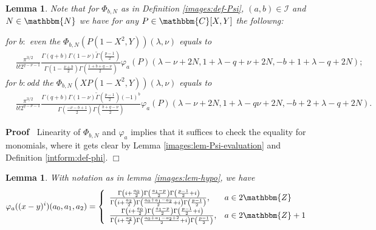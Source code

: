 \documentclass{article}
\renewenvironment{proof}{\noindent\textbf{Proof\ }}{\hspace*{\fill}$\Box$\medskip}
\newtheorem{lemma}[proposition]{Lemma}
\theoremstyle{remark}
\begin{document}
\begin{lemma}
  \label{images:rem-lem-hypo}Note that for $\Phi_{b, N}$ as in Definition
  \ref{images:def-Psi}, $(a, b) \in \mathcal{I}$ and $N \in \mathbbm{N}$ we
  have for any $P \in \mathbbm{C} [X, Y]$ the followng:
  
  for $b :$ even the $\Phi_{b, N} (P (1 - X^2, Y)) (\lambda, \nu)$ equals to
  \begin{eqnarray}
    & \frac{\pi^{3 / 2}}{b! 2^{q - \nu - 1}} \frac{\Gamma (q + b) \Gamma (1 -
    \nu) \tilde{\Gamma} \left( \frac{p - 1}{2} \right)}{\Gamma \left( 1 -
    \frac{\nu + b}{2} \right) \Gamma \left( \frac{1 + b + q - \nu}{2} \right)}
    \varphi_a (P) (\lambda - \nu + 2 N, 1 + \lambda - q + \nu + 2 N, - b + 1 +
    \lambda - q + 2 N) ; &  \nonumber
  \end{eqnarray}
  for $b :$odd the $\Phi_{b, N} (X P (1 - X^2, Y)) (\lambda, \nu)$ equals to
  \begin{eqnarray}
    & \frac{\pi^{3 / 2}}{b! 2^{q - \nu - 1}} \frac{\Gamma (q + b) \Gamma (1 -
    \nu) \tilde{\Gamma} \left( \frac{p - 1}{2} \right) (- 1)^b}{\Gamma \left(
    \frac{- \nu - b + 1}{2} \right) \Gamma \left( \frac{b + q - \nu}{2}
    \right)} \varphi_a (P) (\lambda - \nu + 2 N, 1 + \lambda - q \nu + 2 N, -
    b + 2 + \lambda - q + 2 N) . &  \nonumber
  \end{eqnarray}
\end{lemma}

\begin{proof}
  Linearity of $\Phi_{b, N}$ and $\varphi_a$ implies that it suffices to check
  the equality for monomials, where it gets clear by Lemma
  \ref{images:lem-Psi-evaluation} and Definition \ref{intform:def-phi}.
\end{proof}

\begin{lemma}
  \label{images:lem-hypo-x-y}With notation as in lemma \ref{images:lem-hypo},
  we have
  \[ \varphi_a ((x - y)^i) (a_0, a_1, a_2) = \left\{ \begin{array}{ll}
       \frac{\hspace{0.17em} \Gamma \left( i + \frac{a_0}{2} \right) \Gamma
       \left( \frac{a_1 - p}{2} \right) \Gamma \left( \frac{p - 1}{2} + i
       \right)}{\Gamma \left( i + \frac{a_2}{2} \right) \Gamma \left(
       \frac{a_0 + a_1 - a_2}{2} + i \right) \Gamma \left( \frac{p - 1}{2}
       \right)}, & a \in 2\mathbbm{Z}\\
       \frac{\hspace{0.17em} \Gamma \left( i + \frac{a_0}{2} \right) \Gamma
       \left( \frac{a_1 - p}{2} \right) \Gamma \left( \frac{p - 1}{2} + i
       \right)}{\Gamma \left( i + \frac{a_2}{2} \right) \Gamma \left(
       \frac{a_0 + a_1 - a_2 + 2}{2} + i \right) \Gamma \left( \frac{p - 1}{2}
       \right)}, & a \in 2\mathbbm{Z}+ 1
     \end{array} \right. \]
\end{lemma}
\end{document}
